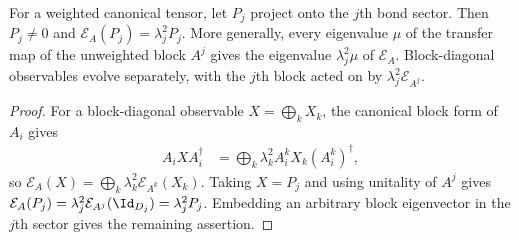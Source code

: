 \begin{lemma}
    \label{lem:half_chain_canonical_sector_eigenvalues}
    \leanok
    For a weighted canonical tensor, let $P_j$ project onto the $j$th
    bond sector. Then $P_j\ne0$ and $\mathcal E_A(P_j)=\lambda_j^2P_j$.
    More generally, every eigenvalue $\mu$ of the transfer map of the
    unweighted block $A^j$ gives the eigenvalue $\lambda_j^2\mu$ of
    $\mathcal E_A$. Block-diagonal observables evolve separately,
    with the $j$th block acted on by $\lambda_j^2\mathcal E_{A^j}$.
\end{lemma}
\begin{proof}\leanok
    For a block-diagonal observable $X=\bigoplus_kX_k$, the canonical
    block form of $A_i$ gives
    \begin{align}
        A_iXA_i^\dagger
         & =\bigoplus_k\lambda_k^2A_i^kX_k\left(A_i^k\right)^\dagger,
        \label{eq:half_chain_canonical_blockwise_transfer}
    \end{align}
    so $\mathcal E_A(X)=\bigoplus_k\lambda_k^2\mathcal E_{A^k}(X_k)$. Taking
    $X=P_j$ and using unitality of $A^j$ gives
    $\mathcal E_A(P_j)=\lambda_j^2\mathcal E_{A^j}(\Id_{D_j})=\lambda_j^2P_j$.
    Embedding an arbitrary block eigenvector in the $j$th sector gives
    the remaining assertion.
\end{proof}


